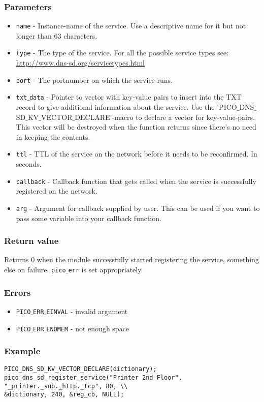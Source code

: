 \subsubsection*{Parameters}
\begin{itemize}[noitemsep]
\item \texttt{name} - Instance-name of the service. Use a descriptive name for it but not longer than 63 characters.
\item \texttt{type} - The type of the service. For all the possible service types see: \url{http://www.dns-sd.org/servicetypes.html}
\item \texttt{port} - The portnumber on which the service runs.
\item \texttt{txt$\_$data} - Pointer to vector with key-value pairs to insert into the TXT record to give additional information about the service. Use the 'PICO$\_$DNS$\_$SD$\_$KV$\_$VECTOR$\_$DECLARE'-macro to declare a vector for key-value-pairs. This vector will be destroyed when the function returns since there's no need in keeping the contents.
\item \texttt{ttl} - TTL of the service on the network before it needs to be reconfirmed. In seconds.
\item \texttt{callback} - Callback function that gets called when the service is successfully registered on the network.
\item \texttt{arg} -  Argument for callback supplied by user. This can be used if you want to pass some variable into your callback function.
\end{itemize}

\subsubsection*{Return value}
Returns 0 when the module successfully started registering the service, something else on failure. \texttt{pico$\_$err} is set appropriately.

\subsubsection*{Errors}
\begin{itemize}[noitemsep]
\item \texttt{PICO$\_$ERR$\_$EINVAL} - invalid argument
\item \texttt{PICO$\_$ERR$\_$ENOMEM} - not enough space
\end{itemize}

\subsubsection*{Example}
\begin{verbatim}
PICO_DNS_SD_KV_VECTOR_DECLARE(dictionary);
pico_dns_sd_register_service("Printer 2nd Floor", "_printer._sub._http._tcp", 80, \\
&dictionary, 240, &reg_cb, NULL);
\end{verbatim}


